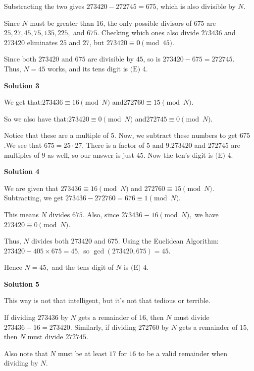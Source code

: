 \begin{enumerate}
 Substracting the two gives $273420 - 272745 = 675$, which is also divisible by $N$.

 Since $N$ must be greater than $16$, the only possible divisors of $675$ are $25, 27, 45, 75, 135, 225,$ and $675$. Checking which ones also divide $273436$ and $273420$ eliminates $25$ and $27$, but $273420 \equiv 0 \pmod {45}$.

 Since both $273420$ and $675$ are divisible by $45$, so is $273420-675=272745$. Thus, $N = 45$ works, and its tens digit is $\boxed{\text{(E) }4}$.

 



\textbf{Solution 3}

We get that:$273436 \equiv {16}\pmod{N}$ and$272760 \equiv {15}\pmod{N}$.

 So we also have that:$273420 \equiv {0}\pmod{N}$ and$272745 \equiv {0}\pmod{N}.$

 Notice that these are a multiple of $5$. Now, we subtract these numbers to get $675$.We see that $675 = 25 \cdot 27.$ There is a factor of $5$ and $9$.$273420$ and $272745$ are multiples of $9$ as well, so our answer is just 45. Now the ten's digit is $\boxed{\text{(E) }4}$.

 



\textbf{Solution 4}

We are given that $273436 \equiv 16 \pmod{N}$ and $272760 \equiv 15 \pmod{N}.$  Subtracting, we get $273436 - 272760 = 676 \equiv 1 \pmod{N}.$ 

 This means $N$ divides $675.$  Also, since $273436 \equiv 16 \pmod{N},$ we have $273420 \equiv 0 \pmod{N}.$ 

 Thus, $N$ divides both $273420$ and $675.$ Using the Euclidean Algorithm:  $273420 - 405 \times 675 = 45,$ so $\gcd(273420, 675) = 45.$ 

 Hence $N = 45,$ and the tens digit of $N$ is $\boxed{\text{(E) }4}.$




\textbf{Solution 5}

This way is not that intelligent, but it's not that tedious or terrible. 

 If dividing $273436$ by $N$ gets a remainder of $16$, then $N$ must divide $273436-16=273420$. Similarly, if dividing $272760$ by $N$ gets a remainder of $15$, then $N$ must divide $272745$. 

 Also note that $N$ must be at least $17$ for $16$ to be a valid remainder when dividing by $N$.


\end{enumerate}
